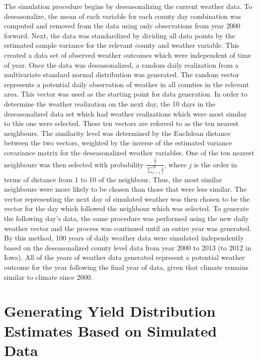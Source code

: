 The simulation procedure begins by deseasonalizing the current weather data. To deseasonalize, the mean of each variable for each county day combination was computed and removed from the data using only observations from year 2000 forward. Next, the data was standardized by dividing all data points by the estimated sample variance for the relevant county and weather variable. This created a data set of observed weather outcomes which were independent of time of year. Once the data was deseasonalized, a random daily realization from a multivariate standard normal distribution was generated. The random vector represents a potential daily observation of weather in all counties in the relevant area. This vector was used as the starting point for data generation.   In order to determine the weather realization on the next day, the 10 days in the deseasonalized data set which had weather realizations which were most similar to this one were selected. These ten vectors are referred to as the ten nearest neighbours. The similarity level was determined by the Euclidean distance between the two vectors, weighted by the inverse of the estimated variance covariance matrix for the deseasonalized weather variables. One of the ten nearest neighbours was then selected with probability $\frac{\frac{1}{j}}{\sum_{j=1}^{10}\frac{1}{j}}$, where $j$ is the order in terms of distance from 1 to 10 of the neighbour. Thus, the most similar neighbours were more likely to be chosen than those that were less similar. The vector representing the next day of simulated weather was then chosen to be the vector for the day which followed the neighbour which was selected. To generate the following day’s data, the same procedure was performed using the new daily weather vector and the process was continued until an entire year was generated. By this method, 100 years of daily weather data were simulated independently based on the deseasonalized county level data from year 2000 to 2013 (to 2012 in Iowa). All of the years of weather data generated represent a potential weather outcome for the year following the final year of data, given that climate remains similar to climate since 2000. 

\section{Generating Yield Distribution Estimates Based on Simulated Data}


